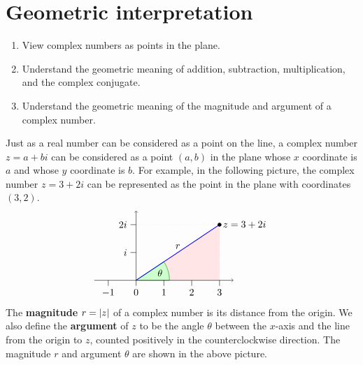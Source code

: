 \section{Geometric interpretation}

\begin{outcome}
  \begin{enumerate}
  \item View complex numbers as points in the plane.
  \item Understand the geometric meaning of addition, subtraction,
    multiplication, and the complex conjugate.
  \item Understand the geometric meaning of the magnitude and argument
    of a complex number.
  \end{enumerate}
\end{outcome}

Just as a real number can be considered as a point on the line, a
complex number $z = a + bi$ can be considered as a point $(a,b)$ in
the plane whose $x$ coordinate is $a$ and whose $y$ coordinate is
$b$. For example, in the following picture, the complex number
$z = 3+2i$ can be represented as the point in the plane with
coordinates $(3,2)$.
\begin{equation*}
  \begin{tikzpicture}
    \draw[help lines, dotted, fill=red!10] (0,0) -- (3,0) -- (3,2) -- cycle;
    \draw[help lines, dotted] (0,2) -- (3,2);
    \filldraw[fill=green!20,draw=green!50!black] (0,0) -- (1.2,0) arc (0:33.69:1.2) -- cycle;
    \node at (16.845:9mm){$\theta$};
    \draw[->](-1.5,0) -- (3.5,0);
    \draw[->](0,0) -- (0,2.5);
    \draw(0,1) -- +(-0.2,0) node[left] {$i$};
    \draw(0,2) -- +(-0.2,0) node[left] {$2i$};
    \draw(-1,0) -- +(0,-0.2) node[below] {$-1$};
    \draw(0,0) -- +(0,-0.2) node[below] {$0$};
    \draw(1,0) -- +(0,-0.2) node[below] {$1$};
    \draw(2,0) -- +(0,-0.2) node[below] {$2$};
    \draw(3,0) -- +(0,-0.2) node[below] {$3$};
    \draw[thick, blue] (0,0) -- node[above, black] {$r$} (3,2);
    \draw[fill, black] (3,2) circle [radius=1.8pt] node [right] {$z = 3+2i$};
  \end{tikzpicture}
\end{equation*}
The \textbf{magnitude}%
%
 $r=\left|z\right|$ of a complex number
is its distance from the origin. We also define the \textbf{argument}
of $z$ to be the angle $\theta$ between the $x$-axis and the line from
the origin to $z$, counted positively in the counterclockwise
direction. The magnitude $r$ and argument $\theta$ are shown in the
above picture.

